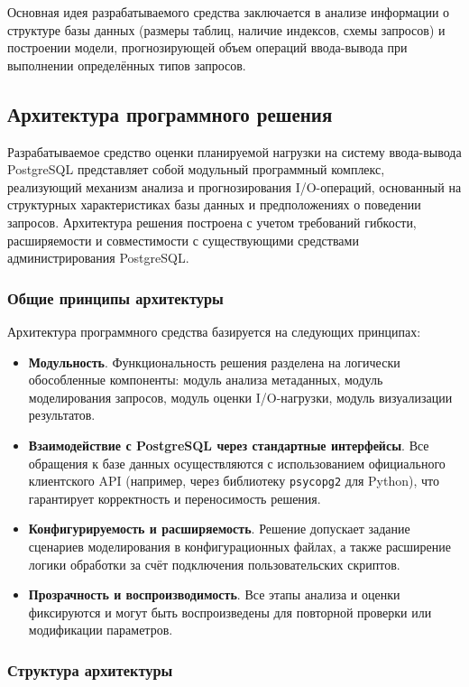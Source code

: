 Основная идея разрабатываемого средства заключается в анализе информации о структуре базы данных (размеры таблиц, наличие индексов, схемы запросов) и построении модели, прогнозирующей объем операций ввода-вывода при выполнении определённых типов запросов.

\subsection{Архитектура программного решения}

Разрабатываемое средство оценки планируемой нагрузки на систему ввода-вывода PostgreSQL представляет собой модульный программный комплекс, реализующий механизм анализа и прогнозирования I/O-операций, основанный на структурных характеристиках базы данных и предположениях о поведении запросов. Архитектура решения построена с учетом требований гибкости, расширяемости и совместимости с существующими средствами администрирования PostgreSQL.

\subsubsection{Общие принципы архитектуры}

Архитектура программного средства базируется на следующих принципах:

\begin{itemize}
\item \textbf{Модульность}. Функциональность решения разделена на логически обособленные компоненты: модуль анализа метаданных, модуль моделирования запросов, модуль оценки I/O-нагрузки, модуль визуализации результатов.
\item \textbf{Взаимодействие с PostgreSQL через стандартные интерфейсы}. Все обращения к базе данных осуществляются с использованием официального клиентского API (например, через библиотеку \texttt{psycopg2} для Python), что гарантирует корректность и переносимость решения.
\item \textbf{Конфигурируемость и расширяемость}. Решение допускает задание сценариев моделирования в конфигурационных файлах, а также расширение логики обработки за счёт подключения пользовательских скриптов.
\item \textbf{Прозрачность и воспроизводимость}. Все этапы анализа и оценки фиксируются и могут быть воспроизведены для повторной проверки или модификации параметров.
\end{itemize}

\subsubsection{Структура архитектуры}

